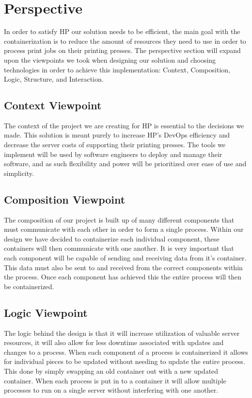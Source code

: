 \documentclass[onecolumn, draftclsnofoot,10pt, compsoc]{IEEEtran}
\begin{document}
\section{Perspective}
In order to satisfy HP our solution needs to be efficient, the main goal with the containerization is to reduce the amount of resources they need to use in order to process print jobs on their printing presses. The perspective section will expand upon the viewpoints we took when designing our solution and choosing technologies in order to achieve this implementation: Context, Composition, Logic, Structure, and Interaction.

\subsection{Context Viewpoint}
The context of the project we are creating for HP is essential to the decisions we made. This solution is meant purely to increase HP’s DevOps efficiency and decrease the server costs of supporting their printing presses. The tools we implement will be used by software engineers to deploy and manage their software, and as such flexibility and power will be prioritized over ease of use and simplicity.
\subsection{Composition Viewpoint}
The composition of our project is built up of many different components that must communicate with each other in order to form a single process. Within our design we have decided to containerize each individual component, these containers will then communicate with one another. It is very important that each component will be capable of sending and receiving data from it's container. This data must also be sent to and received from the correct components within the process. Once each component has achieved this the entire process will then be containerized. 
\subsection{Logic Viewpoint}
The logic behind the design is that it will increase utilization of valuable server resources, it will also allow for less downtime associated with updates and changes to a process. When each component of a process is containerized it allows for individual pieces to be updated without needing to update the entire process. This done by simply swapping an old container out with a new updated container. When each process is put in to a container it will allow multiple processes to run on a single server without interfering with one another. 
\end{document}
